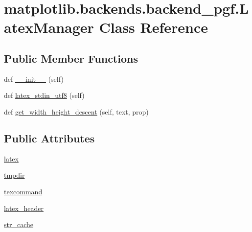 \hypertarget{classmatplotlib_1_1backends_1_1backend__pgf_1_1LatexManager}{}\section{matplotlib.\+backends.\+backend\+\_\+pgf.\+Latex\+Manager Class Reference}
\label{classmatplotlib_1_1backends_1_1backend__pgf_1_1LatexManager}
\subsection*{Public Member Functions}
\begin{DoxyCompactItemize}
\item 
def \hyperlink{classmatplotlib_1_1backends_1_1backend__pgf_1_1LatexManager_ab8e295939d1e21fb8ff423757ae2f513}{\+\_\+\+\_\+init\+\_\+\+\_\+} (self)
\item 
def \hyperlink{classmatplotlib_1_1backends_1_1backend__pgf_1_1LatexManager_a335f3eec21c794c6fa9f779ecf05c6ba}{latex\+\_\+stdin\+\_\+utf8} (self)
\item 
def \hyperlink{classmatplotlib_1_1backends_1_1backend__pgf_1_1LatexManager_ac079bbbbcc97efdf5305122796fa3541}{get\+\_\+width\+\_\+height\+\_\+descent} (self, text, prop)
\end{DoxyCompactItemize}
\subsection*{Public Attributes}
\begin{DoxyCompactItemize}
\item 
\hyperlink{classmatplotlib_1_1backends_1_1backend__pgf_1_1LatexManager_a38f80ceb99b801a819b78591ddae1a1c}{latex}
\item 
\hyperlink{classmatplotlib_1_1backends_1_1backend__pgf_1_1LatexManager_a6377ab21736ae14fc102469e94ecfb4e}{tmpdir}
\item 
\hyperlink{classmatplotlib_1_1backends_1_1backend__pgf_1_1LatexManager_a8ef52e71e05fe3206715670cbc3705e6}{texcommand}
\item 
\hyperlink{classmatplotlib_1_1backends_1_1backend__pgf_1_1LatexManager_a846f9a15d3611cd494d21810dff7322d}{latex\+\_\+header}
\item 
\hyperlink{classmatplotlib_1_1backends_1_1backend__pgf_1_1LatexManager_af1e3e40020a7182f7bd979e6ac41f7d9}{str\+\_\+cache}
\end{DoxyCompactItemize}



